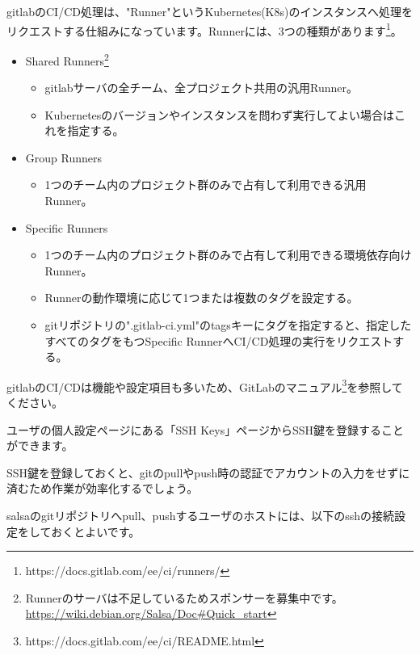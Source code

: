 \documentclass[mingoth,a4paper]{jsarticle}
\begin{document}
gitlabのCI/CD処理は、"Runner"というKubernetes(K8s)のインスタンスへ処理をリクエストする仕組みになっています。Runnerには、3つの種類があります\footnote{https://docs.gitlab.com/ee/ci/runners/}。

\begin{itemize}
\item Shared Runners\footnote{Runnerのサーバは不足しているためスポンサーを募集中です。\url{https://wiki.debian.org/Salsa/Doc\#Quick_start}}
  \begin{itemize}
  \item gitlabサーバの全チーム、全プロジェクト共用の汎用Runner。
  \item Kubernetesのバージョンやインスタンスを問わず実行してよい場合はこれを指定する。
  \end{itemize}
\item Group Runners
  \begin{itemize}
  \item 1つのチーム内のプロジェクト群のみで占有して利用できる汎用Runner。
  \end{itemize}
\item Specific Runners
  \begin{itemize}
  \item 1つのチーム内のプロジェクト群のみで占有して利用できる環境依存向けRunner。
  \item Runnerの動作環境に応じて1つまたは複数のタグを設定する。
  \item gitリポジトリの".gitlab-ci.yml"のtagsキーにタグを指定すると、指定したすべてのタグをもつSpecific RunnerへCI/CD処理の実行をリクエストする。
  \end{itemize}
\end{itemize}

gitlabのCI/CDは機能や設定項目も多いため、GitLabのマニュアル\footnote{https://docs.gitlab.com/ee/ci/README.html}を参照してください。



ユーザの個人設定ページにある「SSH Keys」ページからSSH鍵を登録することができます。

SSH鍵を登録しておくと、gitのpullやpush時の認証でアカウントの入力をせずに済むため作業が効率化するでしょう。

salsaのgitリポジトリへpull、pushするユーザのホストには、以下のsshの接続設定をしておくとよいです。

\end{document}
